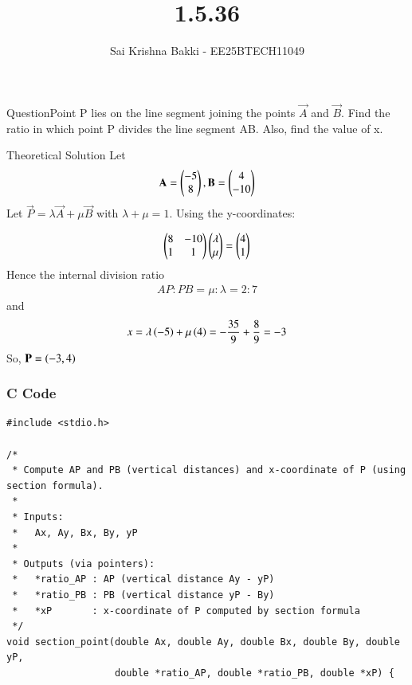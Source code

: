 \documentclass{beamer}
\title %
{1.5.36}
\date{}
\author %
{Sai Krishna Bakki - EE25BTECH11049}
\begin{document}
\frame{\titlepage}
\begin{frame}{Question}Point P lies on the line segment joining the points $\vec{A}$ and $\vec{B}$. Find the ratio in which point P divides the line segment AB. Also, find the value of x.
\end{frame}
\begin{frame}{Theoretical Solution}
    Let 
\begin{align*}
\mathbf{A}= \begin{pmatrix}-5 \\ 8\end{pmatrix}, \mathbf{B}= \begin{pmatrix}4 \\ -10\end{pmatrix}
\end{align*}
Let $\vec{P} = \lambda\vec{A} + \mu\vec{B}$ with $\lambda + \mu =1$. Using the y-coordinates:

\begin{align}
    \begin{pmatrix}8 & -10 \\ 1 & 1\end{pmatrix} \begin{pmatrix}\lambda \\ \mu\end{pmatrix} = \begin{pmatrix}4 \\ 1\end{pmatrix}
\end{align}
Hence the internal division ratio
\begin{align}
    AP:PB = \mu:\lambda=2:7
\end{align}
and
\begin{align}
   x=\lambda\left(-5\right)+\mu\left(4\right)= -\frac{35}{9} + \frac{8}{9} = -3
\end{align}
So, $\mathbf{P}=\left(-3,4\right)$
\end{frame}

\begin{frame}[fragile]
\frametitle{C Code }
\begin{lstlisting}
#include <stdio.h>

/*
 * Compute AP and PB (vertical distances) and x-coordinate of P (using section formula).
 *
 * Inputs:
 *   Ax, Ay, Bx, By, yP
 *
 * Outputs (via pointers):
 *   *ratio_AP : AP (vertical distance Ay - yP)
 *   *ratio_PB : PB (vertical distance yP - By)
 *   *xP       : x-coordinate of P computed by section formula
 */
void section_point(double Ax, double Ay, double Bx, double By, double yP,
                   double *ratio_AP, double *ratio_PB, double *xP) {
\end{lstlisting}
\end{frame}
\end{document}
